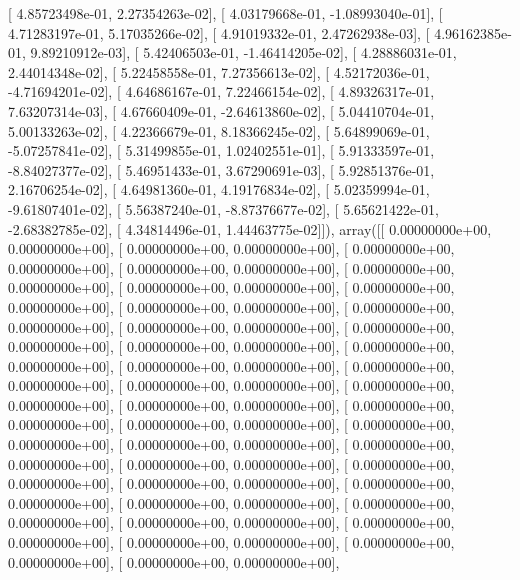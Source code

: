 \documentclass{article}
\begin{document}
       [  4.85723498e-01,   2.27354263e-02],
       [  4.03179668e-01,  -1.08993040e-01],
       [  4.71283197e-01,   5.17035266e-02],
       [  4.91019332e-01,   2.47262938e-03],
       [  4.96162385e-01,   9.89210912e-03],
       [  5.42406503e-01,  -1.46414205e-02],
       [  4.28886031e-01,   2.44014348e-02],
       [  5.22458558e-01,   7.27356613e-02],
       [  4.52172036e-01,  -4.71694201e-02],
       [  4.64686167e-01,   7.22466154e-02],
       [  4.89326317e-01,   7.63207314e-03],
       [  4.67660409e-01,  -2.64613860e-02],
       [  5.04410704e-01,   5.00133263e-02],
       [  4.22366679e-01,   8.18366245e-02],
       [  5.64899069e-01,  -5.07257841e-02],
       [  5.31499855e-01,   1.02402551e-01],
       [  5.91333597e-01,  -8.84027377e-02],
       [  5.46951433e-01,   3.67290691e-03],
       [  5.92851376e-01,   2.16706254e-02],
       [  4.64981360e-01,   4.19176834e-02],
       [  5.02359994e-01,  -9.61807401e-02],
       [  5.56387240e-01,  -8.87376677e-02],
       [  5.65621422e-01,  -2.68382785e-02],
       [  4.34814496e-01,   1.44463775e-02]]), array([[  0.00000000e+00,   0.00000000e+00],
       [  0.00000000e+00,   0.00000000e+00],
       [  0.00000000e+00,   0.00000000e+00],
       [  0.00000000e+00,   0.00000000e+00],
       [  0.00000000e+00,   0.00000000e+00],
       [  0.00000000e+00,   0.00000000e+00],
       [  0.00000000e+00,   0.00000000e+00],
       [  0.00000000e+00,   0.00000000e+00],
       [  0.00000000e+00,   0.00000000e+00],
       [  0.00000000e+00,   0.00000000e+00],
       [  0.00000000e+00,   0.00000000e+00],
       [  0.00000000e+00,   0.00000000e+00],
       [  0.00000000e+00,   0.00000000e+00],
       [  0.00000000e+00,   0.00000000e+00],
       [  0.00000000e+00,   0.00000000e+00],
       [  0.00000000e+00,   0.00000000e+00],
       [  0.00000000e+00,   0.00000000e+00],
       [  0.00000000e+00,   0.00000000e+00],
       [  0.00000000e+00,   0.00000000e+00],
       [  0.00000000e+00,   0.00000000e+00],
       [  0.00000000e+00,   0.00000000e+00],
       [  0.00000000e+00,   0.00000000e+00],
       [  0.00000000e+00,   0.00000000e+00],
       [  0.00000000e+00,   0.00000000e+00],
       [  0.00000000e+00,   0.00000000e+00],
       [  0.00000000e+00,   0.00000000e+00],
       [  0.00000000e+00,   0.00000000e+00],
       [  0.00000000e+00,   0.00000000e+00],
       [  0.00000000e+00,   0.00000000e+00],
       [  0.00000000e+00,   0.00000000e+00],
       [  0.00000000e+00,   0.00000000e+00],
       [  0.00000000e+00,   0.00000000e+00],
       [  0.00000000e+00,   0.00000000e+00],
       [  0.00000000e+00,   0.00000000e+00],
\end{document}
